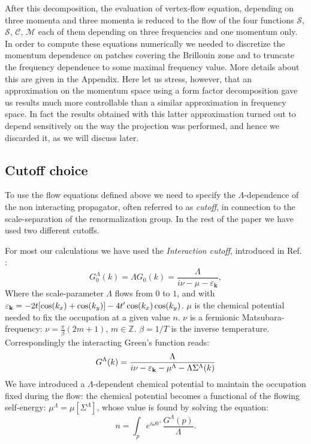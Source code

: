 After this decomposition, the evaluation of vertex-flow equation, depending on three momenta and three momenta is reduced to the flow of the four functions $\mathcal{S}$, $\mathcal{S}$, $\mathcal{C}$, $\mathcal{M}$ each of them depending on three frequencies and one momentum only. In order to compute these equations numerically we needed to discretize the momentum dependence on patches covering the Brillouin zone and to truncate the frequency dependence to some maximal frequency value. More details about this are given in the Appendix. Here let us stress, however, that an approximation on the momentum space using a form factor decomposition gave us results much more controllable than a similar approximation\cite{Karrasch2008a} in frequency space. 
In fact the results obtained with this latter approximation turned out to depend sensitively on the way the projection was performed, and hence we discarded it, as we will discuss later. 

\subsection{Cutoff choice}
To use the flow equations defined above we need to specify the $\Lambda$-dependence of the non interacting propagator, often referred to as \textit{cutoff}, in connection to the scale-separation of the renormalization group. 
In the rest of the paper we have used two different cutoffs. 
 
 For most our calculations we have used the \textit{Interaction cutoff}, introduced in Ref. : 
 \begin{equation}
 G_0^\Lambda(k) = \Lambda G_0(k)=\frac{\Lambda}{i\nu-\mu-\varepsilon_{\mathbf{k}} } , 
 \end{equation}
  Where the scale-parameter $\Lambda$ flows from $0$ to $1$, and  
 with $\varepsilon_{\mathbf{k}} = -2 t [\cos(k_x)+\cos(k_y)] - 4 t' \cos(k_x)\cos(k_y)$. $\mu$ is the chemical potential needed to fix the occupation at a given value $n$. $\nu$ is a fermionic Matsubara-frequency: $\nu = \frac{\pi}{\beta} (2m+1)$, $m\in \mathbb{Z}$. $\beta=1/T$ is the inverse temperature.       
Correspondingly the interacting Green's function reads: 
\begin{equation}
G^\Lambda (k) = \frac{\Lambda}{i\nu - \varepsilon_{\mathbf{k}} -\mu^\Lambda-\Lambda\Sigma^\Lambda(k)} 
\end{equation} 
We have introduced a $\Lambda$-dependent chemical potential to maintain the occupation fixed during the flow:  the chemical potential becomes a functional of the flowing self-energy: $\mu^\Lambda=\mu[\Sigma^\Lambda]$, whose value is found by solving the equation:  
\begin{equation}
n = \int_p e^{i\omega 0^{+}} \frac{G^\Lambda(p)}{\Lambda}. 
\end{equation}  

